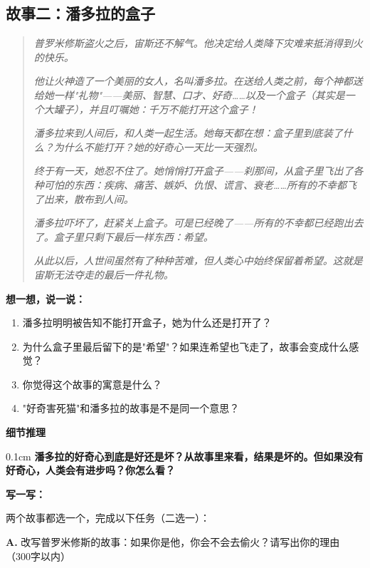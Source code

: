 \documentclass[a4paper,12pt]{ctexart}
\newcommand{\thinktitle}{%
  \vspace{0.3cm}
  {\large\textcolor{orange!80!black}{\textbf{想一想，说一说：}}}
}
\newcommand{\writetitle}{%
  \vspace{0.3cm}
  {\large\textcolor{blue!70!black}{\textbf{写一写：}}}
}
\newcommand{\inferbox}[1]{%
  \vspace{0.2cm}
  \noindent\colorbox{orange!40!white}{\textcolor{black!80!white}{\small\textbf{\hspace{0.3cm}细节推理\hspace{0.3cm}}}}
  \par #1
}
\begin{document}
\vspace{0.5cm}

\subsection*{\textcolor{teal!80!black}{故事二：潘多拉的盒子}}

\begin{quote}
\textit{普罗米修斯盗火之后，宙斯还不解气。他决定给人类降下灾难来抵消得到火的快乐。}

\textit{他让火神造了一个美丽的女人，名叫潘多拉。在送给人类之前，每个神都送给她一样"礼物"——美丽、智慧、口才、好奇……以及一个盒子（其实是一个大罐子），并且叮嘱她：千万不能打开这个盒子！}

\textit{潘多拉来到人间后，和人类一起生活。她每天都在想：盒子里到底装了什么？为什么不能打开？她的好奇心一天比一天强烈。}

\textit{终于有一天，她忍不住了。她悄悄打开盒子——刹那间，从盒子里飞出了各种可怕的东西：疾病、痛苦、嫉妒、仇恨、谎言、衰老……所有的不幸都飞了出来，散布到人间。}

\textit{潘多拉吓坏了，赶紧关上盒子。可是已经晚了——所有的不幸都已经跑出去了。盒子里只剩下最后一样东西：希望。}

\textit{从此以后，人世间虽然有了种种苦难，但人类心中始终保留着希望。这就是宙斯无法夺走的最后一件礼物。}
\end{quote}

\vspace{0.3cm}

\thinktitle
\begin{enumerate}
  \item 潘多拉明明被告知不能打开盒子，她为什么还是打开了？
  \item 为什么盒子里最后留下的是"希望"？如果连希望也飞走了，故事会变成什么感觉？
  \item 你觉得这个故事的寓意是什么？
  \item "好奇害死猫"和潘多拉的故事是不是同一个意思？
\end{enumerate}

\inferbox
\vspace{0.1cm}
\noindent
\textbf{潘多拉的好奇心到底是好还是坏？从故事里来看，结果是坏的。但如果没有好奇心，人类会有进步吗？你怎么看？}

\writetitle
\vspace{0.1cm}
两个故事都选一个，完成以下任务（二选一）：

\noindent
\textbf{A.} 改写普罗米修斯的故事：如果你是他，你会不会去偷火？请写出你的理由（300字以内）
\end{document}
